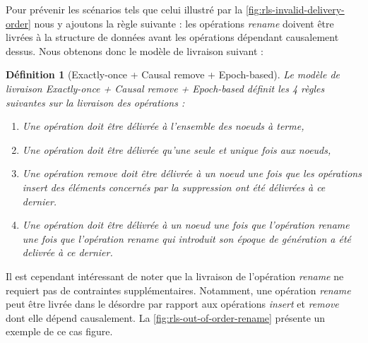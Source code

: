 \documentclass[12pt]{thesul}
\newtheorem{definition}{Définition}
\begin{document}
Pour prévenir les scénarios tels que celui illustré par la \autoref{fig:rls-invalid-delivery-order} nous y ajoutons la règle suivante : les opérations \emph{rename} doivent être livrées à la structure de données avant les opérations dépendant causalement dessus.
Nous obtenons donc le modèle de livraison suivant :

\begin{definition}[Exactly-once + Causal remove + Epoch-based]
  Le modèle de livraison \emph{Exactly-once + Causal remove + Epoch-based} définit les 4 règles suivantes sur la livraison des opérations :
  \begin{enumerate}
    \item Une opération doit être délivrée à l'ensemble des noeuds à terme,
    \item Une opération doit être délivrée qu'une seule et unique fois aux noeuds,
    \item Une opération \emph{remove} doit être délivrée à un noeud une fois que les opérations \emph{insert} des éléments concernés par la suppression ont été délivrées à ce dernier.
    \item Une opération doit être délivrée à un noeud une fois que l'opération \emph{rename} une fois que l'opération \emph{rename} qui introduit son époque de génération a été delivrée à ce dernier.
  \end{enumerate}
\end{definition}

Il est cependant intéressant de noter que la livraison de l'opération \emph{rename} ne requiert pas de contraintes supplémentaires.
Notamment, une opération \emph{rename} peut être livrée dans le désordre par rapport aux opérations \emph{insert} et \emph{remove} dont elle dépend causalement.
La \autoref{fig:rls-out-of-order-rename} présente un exemple de ce cas figure.
\end{document}
